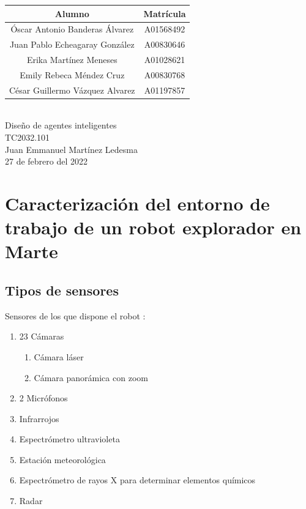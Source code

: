 \documentclass{article}
\begin{document}
\begin{titlepage}
\begin{center}
        \begin{tabular}{|| c | c ||}
            \hline
            Alumno & Matrícula \\
            \hline
            Óscar Antonio Banderas Álvarez  & A01568492 \\
            \hline
            Juan Pablo Echeagaray González & A00830646 \\
            \hline
            Erika Martínez Meneses & A01028621 \\
            \hline
            Emily Rebeca Méndez Cruz & A00830768 \\
            \hline
            César Guillermo Vázquez Alvarez & A01197857 \\
            \hline
        \end{tabular} \\
        \vspace{0.7cm}
        Diseño de agentes inteligentes\\ %
        \vspace{0.2cm}
        TC2032.101\\ %
        \vspace{0.2cm}
        Juan Emmanuel Martínez Ledesma \\ %
        \vspace{0.7cm}
        27 de febrero del 2022 \\ %
        \end{center}
    \end{titlepage}

    \section{Caracterización del entorno de trabajo de un robot explorador en Marte}
        \subsection{Tipos de sensores}
        Sensores de los que dispone el robot \parencite{bbc-news-mundo-2021}:
            \begin{enumerate}
                \item 23 Cámaras
                \begin{enumerate}
                    \item Cámara láser
                    \item Cámara panorámica con zoom
                \end{enumerate}
                \item 2 Micrófonos
                \item Infrarrojos
                \item Espectrómetro ultravioleta
                \item Estación meteorológica
                \item Espectrómetro de rayos X para determinar elementos químicos
                \item Radar
            \end{enumerate}
\end{document}
